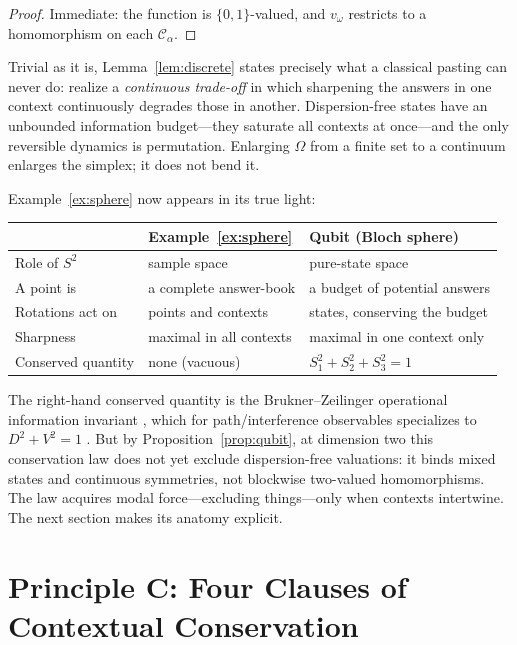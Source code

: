 \documentclass[11pt]{article}
\theoremstyle{definition}
\theoremstyle{remark}
\newcommand{\C}{\mathcal{C}}
\newcommand{\Om}{\Omega}
\begin{document}
\begin{proof}
Immediate: the function is $\{0,1\}$-valued, and $v_\omega$ restricts to
a homomorphism on each $\C_\alpha$.
\end{proof}

Trivial as it is, Lemma~\ref{lem:discrete} states precisely what a
classical pasting can never do: realize a \emph{continuous trade-off} in
which sharpening the answers in one context continuously degrades those
in another. Dispersion-free states have an unbounded information
budget---they saturate all contexts at once---and the only reversible
dynamics is permutation. Enlarging $\Om$ from a finite set to a
continuum enlarges the simplex; it does not bend it.

Example~\ref{ex:sphere} now appears in its true light:

\begin{center}
\begin{tabular}{@{}lll@{}}
\toprule
 & \textbf{Example~\ref{ex:sphere}} & \textbf{Qubit (Bloch sphere)}\\
\midrule
Role of $S^{2}$ & sample space & pure-state space\\
A point is & a complete answer-book & a budget of potential answers\\
Rotations act on & points and contexts & states, conserving the budget\\
Sharpness & maximal in all contexts & maximal in one context only\\
Conserved quantity & none (vacuous) & $S_{1}^{2}+S_{2}^{2}+S_{3}^{2}=1$\\
\bottomrule
\end{tabular}
\end{center}

The right-hand conserved quantity is the Brukner--Zeilinger operational
information invariant \cite{BruknerZeilinger1999}, which for
path/interference observables specializes to $D^{2}+V^{2}=1$
\cite{GreenbergerYasin1988,JaegerShimonyVaidman1995,Englert1996}. But by
Proposition~\ref{prop:qubit}, at dimension two this conservation law
does not yet exclude dispersion-free valuations: it binds mixed states
and continuous symmetries, not blockwise two-valued homomorphisms. The
law acquires modal force---excluding things---only when contexts
intertwine. The next section makes its anatomy explicit.

\section{Principle C: Four Clauses of Contextual Conservation}\label{sec:principle}
\end{document}
